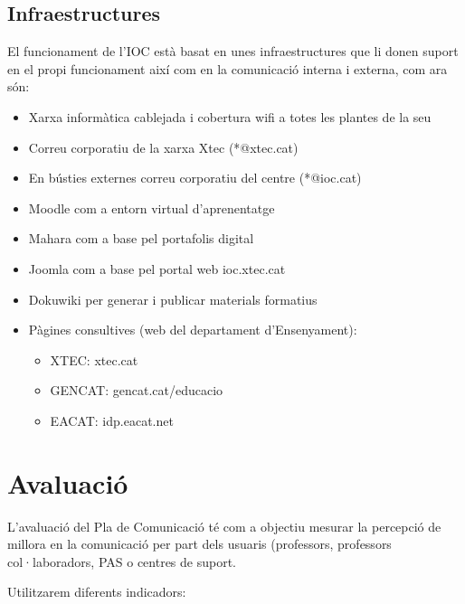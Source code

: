 \documentclass[fontsize=10pt,%
paper=a4,%
DIV=14,%
twoside=semi,%
pagesize=auto,%
parskip=half,
captions=tableheading,%
numbers=noenddot,%
toc=graduated%
]{scrartcl}
\begin{document}
\subsection{Infraestructures}

El funcionament de l'IOC està basat en unes infraestructures que li donen suport en el propi funcionament així com en la comunicació interna i externa, com ara són:

\begin{itemize}
\item Xarxa informàtica cablejada i cobertura wifi a totes les plantes de la seu
\item Correu corporatiu de la xarxa Xtec (*@xtec.cat)
\item En bústies externes correu corporatiu del centre (*@ioc.cat)
\item Moodle com a entorn virtual d'aprenentatge
\item Mahara com a base pel portafolis digital
\item Joomla com a base pel portal web ioc.xtec.cat
\item Dokuwiki per generar i publicar materials formatius
\item Pàgines consultives (web del departament d'Ensenyament):
      \begin{itemize}
      \item XTEC: xtec.cat
      \item GENCAT: gencat.cat/educacio
      \item EACAT: idp.eacat.net
      \end{itemize}
\end{itemize}

\section{Avaluació}\label{sec:aval}

L'avaluació del Pla de Comunicació té com a objectiu mesurar la percepció de
millora en la comunicació per part dels usuaris (professors, professors col·laboradors, PAS o centres de suport.

Utilitzarem diferents indicadors:
\end{document}
